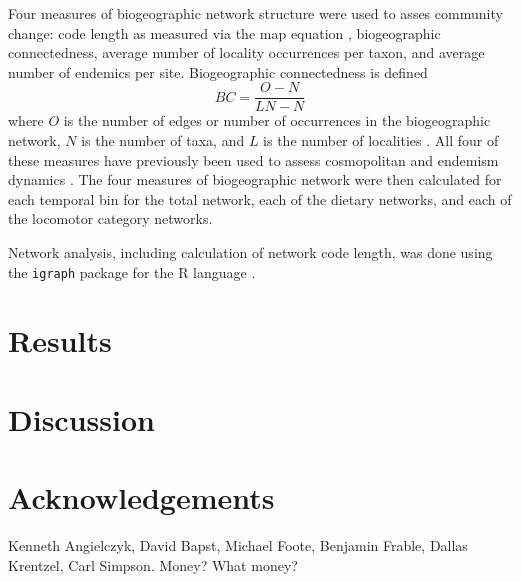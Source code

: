 \documentclass[12pt,letterpaper]{article}
\begin{document}
Four measures of biogeographic network structure were used to asses community change: code length as measured via the map equation \citep{Rosvall2007a,Rosvall2008,Rosvall2010b}, biogeographic connectedness, average number of locality occurrences per taxon, and average number of endemics per site. Biogeographic connectedness is defined 
\begin{equation}
  BC = \frac{O - N}{LN - N}
  \label{eq:bc}
\end{equation}
where \(O\) is the number of edges or number of occurrences in the biogeographic network, \(N\) is the number of taxa, and \(L\) is the number of localities \citep{Sidor2013}. All four of these measures have previously been used to assess cosmopolitan and endemism dynamics \citep{Sidor2013}. The four measures of biogeographic network were then calculated for each temporal bin for the total network, each of the dietary networks, and each of the locomotor category networks.

Network analysis, including calculation of network code length, was done using the \texttt{igraph} package \citep{Csardi2006} for the R language \citep{R2013}.

%
%


\section{Results}


\section{Discussion}


\section*{Acknowledgements}
Kenneth Angielczyk, David Bapst, Michael Foote, Benjamin Frable, Dallas Krentzel, Carl Simpson. Money? What money?



\end{document}
